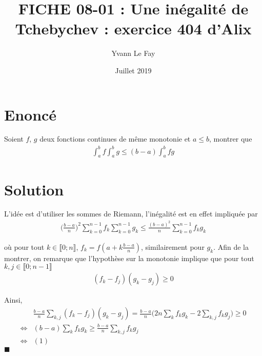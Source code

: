 \documentclass{article}
\newcommand*{\QED}{\hfill\ensuremath{\blacksquare}}%
\begin{document}
\title{FICHE 08-01 : Une inégalité de Tchebychev : exercice 404 d'Alix}
\author{Yvann Le Fay}
\date{Juillet 2019}
\maketitle

\section*{Enoncé}
Soient $f$, $g$ deux fonctions continues de même monotonie et $a \leq b$, montrer que 
\begin{align*}
\int_{a}^b f\int_{a}^b g \leq (b-a)\int_{a}^b fg
\end{align*}
\section*{Solution}
L'idée est d'utiliser les sommes de Riemann, l'inégalité est en effet impliquée par 
\begin{align}
\bigg(\frac{b-a}{n}\bigg)^2\sum_{k=0}^{n-1} f_k \sum_{k=0}^{n-1} g_k \leq \frac{(b-a)^2}{n}\sum_{k=0}^{n-1} {f_k g_k}
\end{align}

où pour tout $k\in\llbracket 0;n\rrbracket$, $f_k = f(a+k\frac{b-a}{n})$, similairement pour $g_k$. Afin de la montrer, on remarque que l'hypothèse sur la monotonie implique que pour tout $k,j\in\llbracket 0;n-1\rrbracket$
\begin{align*}
(f_k-f_j)(g_k-g_j)\geq 0 
\end{align*}

Ainsi, 
\begin{align*}
&\frac{b-a}{n}\sum_{k,j}(f_k-f_j)(g_k-g_j) = \frac{b-a}{n}\bigg(2n\sum_k f_kg_k-2\sum_{k,j} f_kg_j\bigg) \geq 0\\
\Longleftrightarrow &(b-a)\sum_k f_kg_k \geq \frac{b-a}{n}\sum_{k,j}f_kg_j\\
\Longleftrightarrow & (1)
\end{align*}
\QED
\end{document}
